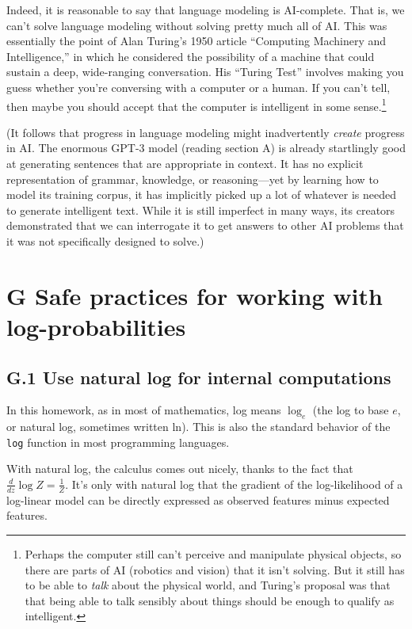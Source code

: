 \documentclass[12pt]{article}
\theoremstyle{plain}
\theoremstyle{definition}
\theoremstyle{remark}
\begin{document}
Indeed, it is reasonable to say that language modeling is AI-complete. That is, we can’t solve language modeling without solving pretty much all of AI. This was essentially the point of Alan Turing’s 1950 article “Computing Machinery and Intelligence,” in which he considered the possibility of a machine that could sustain a deep, wide-ranging conversation. His “Turing Test” involves making you guess whether you’re conversing with a computer or a human. If you can’t tell, then maybe you should accept that the computer is intelligent in some sense.\footnote{Perhaps the computer still can’t perceive and manipulate physical objects, so there are parts of AI (robotics and vision) that it isn’t solving. But it still has to be able to \textit{talk} about the physical world, and Turing’s proposal was that that being able to talk sensibly about things should be enough to qualify as intelligent.}  

(It follows that progress in language modeling might inadvertently \textit{create} progress in AI. The enormous GPT-3 model (reading section A) is already startlingly good at generating sentences that are appropriate in context. It has no explicit representation of grammar, knowledge, or reasoning—yet by learning how to model its training corpus, it has implicitly picked up a lot of whatever is needed to generate intelligent text. While it is still imperfect in many ways, its creators demonstrated that we can interrogate it to get answers to other AI problems that it was not specifically designed to solve.)  

\section*{G Safe practices for working with log-probabilities}

\subsection*{G.1 Use natural log for internal computations}
In this homework, as in most of mathematics, log means $\log_e$ (the log to base $e$, or natural log, sometimes written ln). This is also the standard behavior of the \texttt{log} function in most programming languages.  

With natural log, the calculus comes out nicely, thanks to the fact that $\frac{d}{dz}\log Z = \frac{1}{Z}$. It’s only with natural log that the gradient of the log-likelihood of a log-linear model can be directly expressed as observed features minus expected features.  
\end{document}
